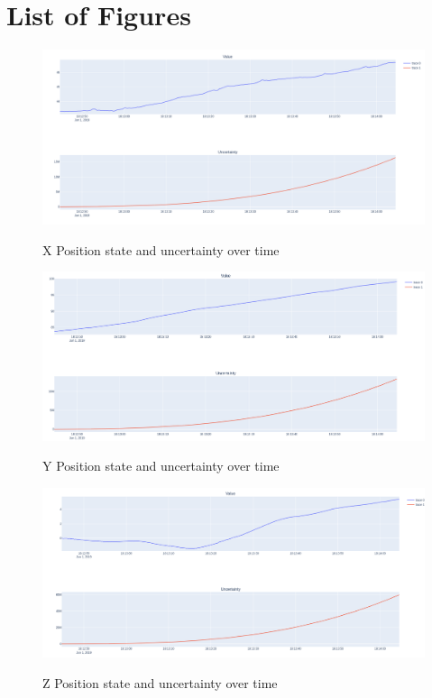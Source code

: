 \documentclass[12pt]{article}
\begin{document}
\newpage
\section{List of Figures}

\begin{figure}[H]
    \centering
    \includegraphics[width=\linewidth]{figures/x_uncertainty.png}\\
    \caption{X Position state and uncertainty over time}
    \label{fig:x}
\end{figure}
\begin{figure}[H]
    \centering
    \includegraphics[width=\linewidth]{figures/y_uncertainty.png}\\
    \caption{Y Position state and uncertainty over time}
    \label{fig:y}
\end{figure}

\begin{figure}[H]
    \centering
    \includegraphics[width=\linewidth]{figures/z_uncertainty.png}\\
    \caption{Z Position state and uncertainty over time}
    \label{fig:z}
\end{figure}
\end{document}
